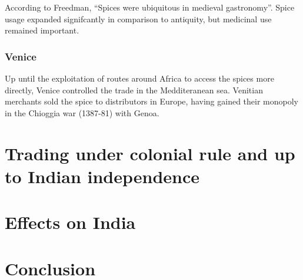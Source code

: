 \documentclass[11pt, a4paper, headings=standardclasses]{scrartcl}
\begin{document}
According to Freedman, ``Spices were ubiquitous in medieval gastronomy''.\autocite[3]{MST} Spice usage expanded signifcantly in comparison to antiquity, but medicinal use remained important.\autocite{RIS}

\subsubsection{Venice}

Up until the exploitation of routes around Africa to access the spices more directly, Venice controlled the trade in the Medditeranean sea. Venitian merchants sold the spice to distributors in Europe, having gained their monopoly in the Chioggia war (1387-81) with Genoa.\autocite{SpiceTrade}
\section{Trading under colonial rule and up to Indian independence}
\section{Effects on India}
\section{Conclusion}
\clearpage
\appendix
\printbibliography
\end{document}
